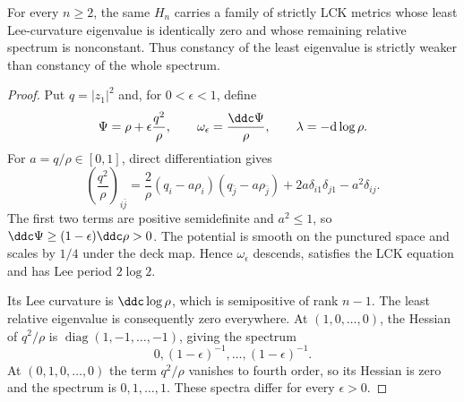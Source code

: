 \begin{example}\label{lck:variable-positive-lee-spectrum}
For every $n\geq2$, the same $H_n$ carries a family of strictly
LCK metrics whose least Lee-curvature eigenvalue is identically
zero and whose remaining relative spectrum is nonconstant.
Thus constancy of the least eigenvalue is strictly weaker than
constancy of the whole spectrum.
\end{example}
\begin{proof}
Put $q=|z_1|^2$ and, for $0<\epsilon<1$, define
\[
 \Psi=\rho+\epsilon\frac{q^2}{\rho},\qquad
 \omega_\epsilon=\frac{\ddc\Psi}{\rho},\qquad
 \lambda=-\mathrm d\log\rho.
\]
For $a=q/\rho\in[0,1]$, direct differentiation gives
\[
 \left(\frac{q^2}{\rho}\right)_{i\bar j}
 =\frac{2}{\rho}(q_i-a\rho_i)(q_{\bar j}-a\rho_{\bar j})
       +2a\delta_{i1}\delta_{j1}-a^2\delta_{ij}.
\]
The first two terms are positive semidefinite and $a^2\leq1$,
so $\ddc\Psi\geq(1-\epsilon)\ddc\rho>0$.
The potential is smooth on the punctured space and scales by
$1/4$ under the deck map. Hence $\omega_\epsilon$ descends,
satisfies the LCK equation and has Lee period $2\log2$.

Its Lee curvature is $\ddc\log\rho$, which is semipositive
of rank $n-1$. The least relative eigenvalue is consequently
zero everywhere. At $(1,0,\ldots,0)$, the Hessian of
$q^2/\rho$ is $\operatorname{diag}(1,-1,\ldots,-1)$, giving
the spectrum
\[
 0,(1-\epsilon)^{-1},\ldots,(1-\epsilon)^{-1}.
\]
At $(0,1,0,\ldots,0)$ the term $q^2/\rho$ vanishes to fourth
order, so its Hessian is zero and the spectrum is
$0,1,\ldots,1$. These spectra differ for every $\epsilon>0$.
\end{proof}

